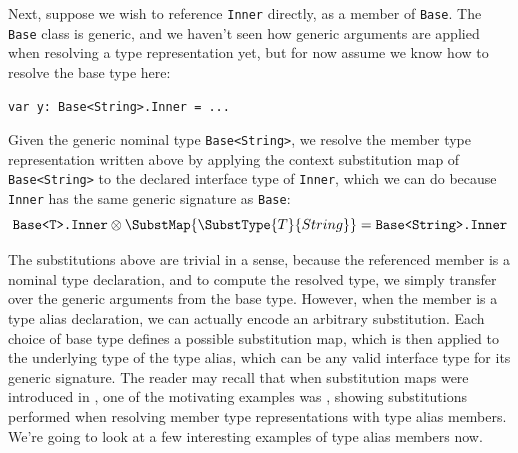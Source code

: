 \documentclass[../generics]{subfiles}
\begin{document}
Next, suppose we wish to reference \texttt{Inner} directly, as a member of \texttt{Base}. The \texttt{Base} class is generic, and we haven't seen how generic arguments are applied when resolving a type representation yet, but for now assume we know how to resolve the base type here:
\begin{Verbatim}
var y: Base<String>.Inner = ...
\end{Verbatim}
Given the generic nominal type \texttt{Base<String>}, we resolve the member type representation written above by applying the context substitution map of \texttt{Base<String>} to the declared interface type of \texttt{Inner}, which we can do because \texttt{Inner} has the same generic signature as \texttt{Base}:
\[\texttt{Base<T>.Inner}\otimes\SubstMap{\SubstType{T}{String}}=\texttt{Base<String>.Inner}\]

The substitutions above are trivial in a sense, because the referenced member is a nominal type declaration, and to compute the resolved type, we simply transfer over the generic arguments from the base type. However, when the member is a type alias declaration, we can actually encode an arbitrary substitution. Each choice of base type defines a possible substitution map, which is then applied to the underlying type of the type alias, which can be any valid interface type for its generic signature. The reader may recall that when substitution maps were introduced in , one of the motivating examples was , showing substitutions performed when resolving member type representations with type alias members. We're going to look at a few interesting examples of type alias members now.

\smallskip
\end{document}
